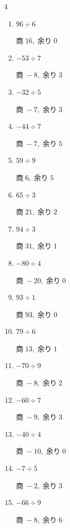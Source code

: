 \begin{multicols}{4}
\begin{enumerate}
        $商\; -19,\; 余り\; 0$

  \item $96 \div 6$

        $商\; 16,\; 余り\; 0$

  \item $-53 \div 7$

        $商\; -8,\; 余り\; 3$

  \item $-32 \div 5$

        $商\; -7,\; 余り\; 3$

  \item $-44 \div 7$

        $商\; -7,\; 余り\; 5$

  \item $59 \div 9$

        $商\; 6,\; 余り\; 5$

  \item $65 \div 3$

        $商\; 21,\; 余り\; 2$

  \item $94 \div 3$

        $商\; 31,\; 余り\; 1$

  \item $-80 \div 4$

        $商\; -20,\; 余り\; 0$

  \item $93 \div 1$

        $商\; 93,\; 余り\; 0$

  \item $79 \div 6$

        $商\; 13,\; 余り\; 1$

  \item $-70 \div 9$

        $商\; -8,\; 余り\; 2$

  \item $-60 \div 7$

        $商\; -9,\; 余り\; 3$

  \item $-40 \div 4$

        $商\; -10,\; 余り\; 0$

  \item $-7 \div 5$

        $商\; -2,\; 余り\; 3$

  \item $-66 \div 9$

        $商\; -8,\; 余り\; 6$


\end{enumerate}
\end{multicols}
